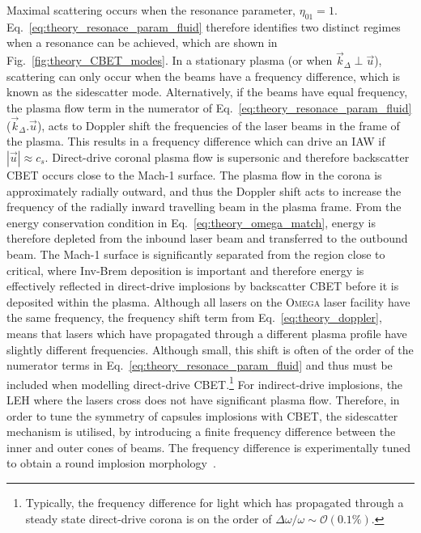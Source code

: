 Maximal scattering occurs when the resonance parameter, $\eta_{01}=1$.
Eq.~\ref{eq:theory_resonace_param_fluid} therefore identifies two distinct regimes when a resonance can be achieved, which are shown in Fig.~\ref{fig:theory_CBET_modes}.
In a stationary plasma (or when $\vec{k}_\Delta \perp \vec{u}$), scattering can only occur when the beams have a frequency difference, which is known as the sidescatter mode.
Alternatively, if the beams have equal frequency, the plasma flow term in the numerator of Eq.~\ref{eq:theory_resonace_param_fluid} ($\vec{k}_\Delta.\vec{u}$), acts to Doppler shift the frequencies of the laser beams in the frame of the plasma.
This results in a frequency difference which can drive an \ac{IAW} if $|\vec{u}|\approx c_s$.
Direct-drive coronal plasma flow is supersonic and therefore backscatter \ac{CBET} occurs close to the Mach-1 surface.
The plasma flow in the corona is approximately radially outward, and thus the Doppler shift acts to increase the frequency of the radially inward travelling beam in the plasma frame.
From the energy conservation condition in Eq.~\ref{eq:theory_omega_match}, energy is therefore depleted from the inbound laser beam and transferred to the outbound beam.
The Mach-1 surface is significantly separated from the region close to critical, where \ac{Inv-Brem} deposition is important and therefore energy is effectively reflected in direct-drive implosions by backscatter \ac{CBET} before it is deposited within the plasma.
Although all lasers on the \textsc{Omega} laser facility have the same frequency, the frequency shift term from Eq.~\ref{eq:theory_doppler}, means that lasers which have propagated through a different plasma profile have slightly different frequencies.
Although small, this shift is often of the order of the numerator terms in Eq.~\ref{eq:theory_resonace_param_fluid} and thus must be included when modelling direct-drive \ac{CBET}.\footnote{Typically, the frequency difference for light which has propagated through a steady state direct-drive corona is on the order of $\Delta\omega/\omega\sim\mathcal{O}(0.1\%)$.}
For indirect-drive implosions, the \ac{LEH} where the lasers cross does not have significant plasma flow.
Therefore, in order to tune the symmetry of capsules implosions with \ac{CBET}, the sidescatter mechanism is utilised, by introducing a finite frequency difference between the inner and outer cones of beams.
The frequency difference is experimentally tuned to obtain a round implosion morphology~\cite{michel_tuning_2009}.

